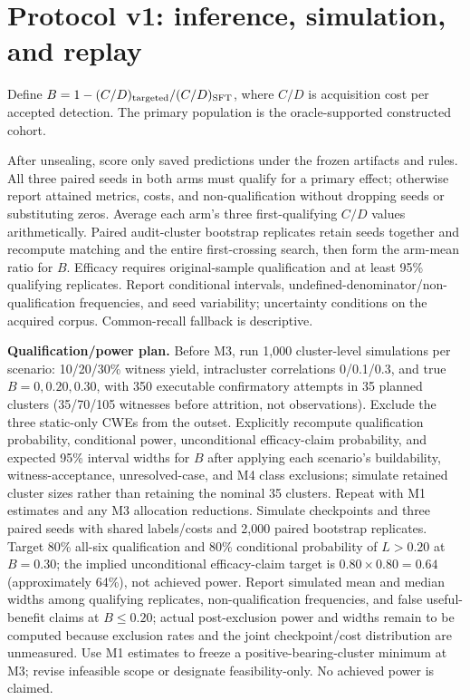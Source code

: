 \documentclass[11pt]{article}
\begin{document}
\section*{Protocol v1: inference, simulation, and replay}
Define $B=1-(C/D)_{\rm targeted}/(C/D)_{\rm SFT}$, where $C/D$ is acquisition cost per accepted detection. The primary population is the oracle-supported constructed cohort.

After unsealing, score only saved predictions under the frozen artifacts and rules. All three paired seeds in both arms must qualify for a primary effect; otherwise report attained metrics, costs, and non-qualification without dropping seeds or substituting zeros. Average each arm's three first-qualifying $C/D$ values arithmetically. Paired audit-cluster bootstrap replicates retain seeds together and recompute matching and the entire first-crossing search, then form the arm-mean ratio for $B$. Efficacy requires original-sample qualification and at least 95\% qualifying replicates. Report conditional intervals, undefined-denominator/non-qualification frequencies, and seed variability; uncertainty conditions on the acquired corpus. Common-recall fallback is descriptive.

\textbf{Qualification/power plan.} Before M3, run 1,000 cluster-level simulations per scenario: 10/20/30\% witness yield, intracluster correlations 0/0.1/0.3, and true $B=0,0.20,0.30$, with 350 executable confirmatory attempts in 35 planned clusters (35/70/105 witnesses before attrition, not observations). Exclude the three static-only CWEs from the outset. Explicitly recompute qualification probability, conditional power, unconditional efficacy-claim probability, and expected 95\% interval widths for $B$ after applying each scenario's buildability, witness-acceptance, unresolved-case, and M4 class exclusions; simulate retained cluster sizes rather than retaining the nominal 35 clusters. Repeat with M1 estimates and any M3 allocation reductions. Simulate checkpoints and three paired seeds with shared labels/costs and 2,000 paired bootstrap replicates. Target 80\% all-six qualification and 80\% conditional probability of $L>0.20$ at $B=0.30$; the implied unconditional efficacy-claim target is $0.80\times0.80=0.64$ (approximately 64\%), not achieved power. Report simulated mean and median widths among qualifying replicates, non-qualification frequencies, and false useful-benefit claims at $B\leq0.20$; actual post-exclusion power and widths remain to be computed because exclusion rates and the joint checkpoint/cost distribution are unmeasured. Use M1 estimates to freeze a positive-bearing-cluster minimum at M3; revise infeasible scope or designate feasibility-only. No achieved power is claimed.
\end{document}
